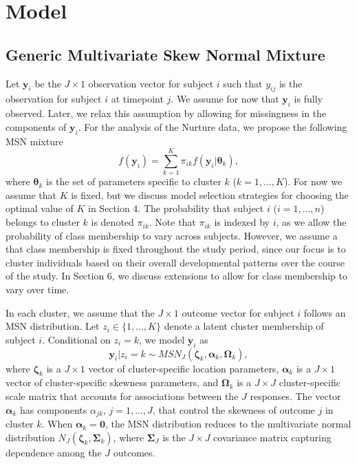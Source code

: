 \documentclass{article}
\begin{document}
\section{Model}
\label{s:model}

\subsection{Generic Multivariate Skew Normal Mixture}

Let $\mathbf{y}_{i}$ be the $J \times 1$ observation vector for subject $i$ such that $y_{ij}$ is the observation for subject $i$ at timepoint $j$. We assume for now that $\mathbf{y}_{i}$ is fully observed. Later, we relax this assumption by allowing for missingness in the components of $\mathbf{y}_{i}$. For the analysis of the Nurture data, we propose the following MSN mixture
\begin{equation}
f(\mathbf{y}_i) = \sum_{k = 1}^{K} \pi_{ik} f(\mathbf{y}_i|\boldsymbol\theta_k),
\end{equation}
where $\boldsymbol\theta_k$ is the set of parameters specific to cluster $k$ ($k = 1,...,K$). For now we assume that $K$ is fixed, but we discuss model selection strategies for choosing the optimal value of $K$ in Section 4. The probability that subject $i$ ($i = 1,...,n$) belongs to cluster $k$ is denoted $\pi_{ik}$. Note that $\pi_{ik}$ is indexed by $i$, as we allow the probability of class membership to vary across subjects. However, we assume a that class membership is fixed throughout the study period, since our focus is to cluster individuals based on their overall developmental patterns over the course of the study. In Section 6, we discuss extensions to allow for class membership to vary over time.

In each cluster, we assume that the $J\times 1$ outcome vector for subject $i$ follows an MSN distribution. Let $z_i \in \{1,...,K\}$ denote a latent cluster membership of subject $i$. Conditional on $z_i = k$, we model $\mathbf{y}_{i}$ as 
\begin{equation}
\mathbf{y}_{i}|z_i=k \sim MSN_J(\boldsymbol\zeta_k,\boldsymbol\alpha_k,\boldsymbol\Omega_k),
\end{equation}
where $\boldsymbol\zeta_k$ is a $J \times 1$ vector of cluster-specific location parameters, $\boldsymbol\alpha_k$ is a $J \times 1$ vector of cluster-specific skewness parameters, and $\boldsymbol\Omega_k$ is a $J \times J$ cluster-specific scale matrix that accounts for associations between the $J$ responses. The vector $\boldsymbol\alpha_k$ has components $\alpha_{jk}$, $j = 1,...,J$, that control the skewness of outcome $j$ in cluster $k$. When $\boldsymbol\alpha_k = \mathbf{0}$, the MSN distribution reduces to the multivariate normal distribution $N_J(\boldsymbol\zeta_k,\boldsymbol\Sigma_k)$, where $\boldsymbol\Sigma_J$ is the $J \times J$ covariance matrix capturing dependence among the $J$ outcomes. 
\end{document}
